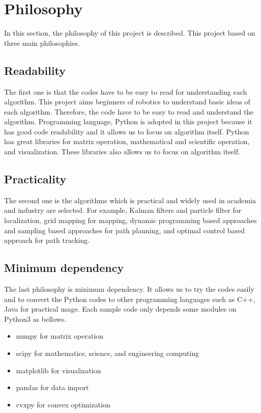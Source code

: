 \documentclass{bmvc2k}
\begin{document}
\section{Philosophy}
In this section, the philosophy of this project is described.
This project based on three main philosophies.

\subsection{Readability}
The first one is that the codes have to be easy to read for understanding each algorithm.
This project aims beginners of robotics to understand basic ideas of each algorithm. 
Therefore, the code have to be easy to read and understand the algorithm.
Programming language, Python\cite{python} is adopted in this project because it has good code readability and it allows us to focus on algorithm itself.
Python has great libraries for matrix operation, mathematical and scientific operation, and visualization.
These libraries also allows us to focus on algorithm itself.

\subsection{Practicality}
The second one is the algorithms which is practical and widely used in academia and industry are selected.
For example, Kalman filters and particle filter for localization, grid mapping for mapping, dynamic programming based approaches and sampling based approaches for path planning, and optimal control based approach for path tracking.

\subsection{Minimum dependency}
The last philosophy is minimum dependency.
It allows us to try the codes easily and to convert the Python codes to other programming languages such as C++, Java for practical usage.
Each sample code only depends some modules on Python3 as bellows.

\begin{itemize}
 \item numpy\cite{numpy} for matrix operation
 \item scipy\cite{scipy} for mathematics, science, and engineering computing
 \item matplotlib\cite{matplotlib} for visualization
 \item pandas\cite{pandas} for data import
 \item cvxpy\cite{cvxpy} for convex optimization
\end{itemize}
\end{document}
